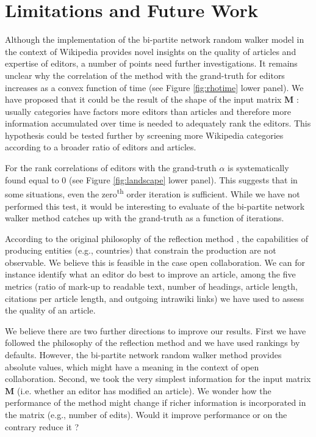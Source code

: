 \section{Limitations and Future Work}
Although the implementation of the bi-partite network random walker model in the context of Wikipedia provides novel insights on the quality of articles and expertise of editors, a number of points need further investigations. It remains unclear why the correlation of the method with the grand-truth for editors increases as a convex function of time (see Figure \ref{fig:rhotime} lower panel). We have proposed that it could be the result of the shape of the input matrix $\mathbf{M}$ : usually categories have factors more editors than articles and therefore more information accumulated over time is needed to adequately rank the editors. This hypothesis could be tested further by screening more Wikipedia categories according to a broader ratio of editors and articles. 

For the rank correlations of editors with the grand-truth $\alpha$ is systematically found equal to $0$ (see Figure \ref{fig:landscape} lower panel). This suggests that in some situations, even the zero\textsuperscript{th} order iteration is sufficient. While we have not performed this test, it would be interesting to evaluate of the bi-partite network walker method catches up with the grand-truth as a function of iterations.

According to the original philosophy of the reflection method \cite{hidalgo2007}, the capabilities of producing entities (e.g., countries) that constrain the production are not observable. We believe this is feasible in the case open collaboration. We can for instance identify what an editor do best to improve an article, among the five metrics (ratio of mark-up to readable text, number of headings, article length, citations per article length, and outgoing intrawiki links) we have used to assess the quality of an article.

We believe there are two further directions to improve our results. First we have followed the philosophy of the reflection method and we have used rankings by defaults. However, the bi-partite network random walker method provides absolute values, which might have a meaning in the context of open collaboration. Second, we took the very simplest information for the input matrix $\mathbf{M}$ (i.e. whether an editor has modified an article). We wonder how the performance of the method might change if richer information is incorporated in the matrix (e.g., number of edits). Would it improve performance or on the contrary reduce it ?


